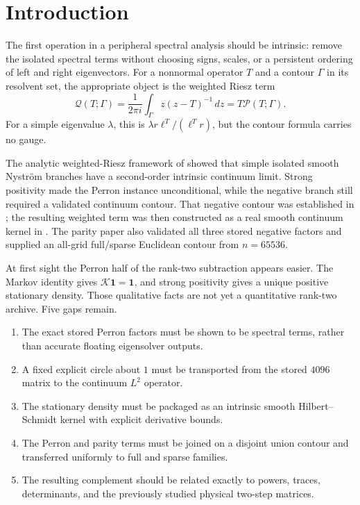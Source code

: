\documentclass[11pt]{article}
\theoremstyle{definition}
\theoremstyle{remark}
\newcommand{\cK}{\mathcal K}
\newcommand{\cP}{\mathcal P}
\newcommand{\cQ}{\mathcal Q}
\begin{document}
\section{Introduction}
\label{sec:introduction}

The first operation in a peripheral spectral analysis should be intrinsic:
remove the isolated spectral terms without choosing signs, scales, or a
persistent ordering of left and right eigenvectors.  For a nonnormal
operator $T$ and a contour $\Gamma$ in its resolvent set, the appropriate
object is the weighted Riesz term
\begin{equation}
 \cQ(T;\Gamma)
 =\frac{1}{2\pi i}\int_\Gamma z(z-T)^{-1}\,dz
 =T\cP(T;\Gamma).
 \label{eq:weighted-riesz-intro}
\end{equation}
For a simple eigenvalue $\lambda$, this is
$\lambda r\ell^T/(\ell^Tr)$, but the contour formula carries no gauge.

The analytic weighted-Riesz framework of
\citet{WangRiesz2026} showed that simple isolated smooth Nystr\"om branches
have a second-order intrinsic continuum limit.  Strong positivity made the
Perron instance unconditional, while the negative branch still required a
validated continuum contour.  That negative contour was established in
\citet{WangContinuumContour2026,WangEuclidean2026}; the resulting weighted
term was then constructed as a real smooth continuum kernel in
\citet{WangParityKernel2026}.  The parity paper also validated all three
stored negative factors and supplied an all-grid full/sparse Euclidean
contour from $n=65536$.

At first sight the Perron half of the rank-two subtraction appears easier.
The Markov identity gives $\cK\mathbf1=\mathbf1$, and strong positivity
gives a unique positive stationary density.  Those qualitative facts are
not yet a quantitative rank-two archive.  Five gaps remain.
\begin{enumerate}[leftmargin=2em]
 \item The exact stored Perron factors must be shown to be spectral terms,
       rather than accurate floating eigensolver outputs.
 \item A fixed explicit circle about $1$ must be transported from the
       stored $4096$ matrix to the continuum $L^2$ operator.
 \item The stationary density must be packaged as an intrinsic smooth
       Hilbert--Schmidt kernel with explicit derivative bounds.
 \item The Perron and parity terms must be joined on a disjoint union
       contour and transferred uniformly to full and sparse families.
 \item The resulting complement should be related exactly to powers,
       traces, determinants, and the previously studied physical two-step
       matrices.
\end{enumerate}
\end{document}
